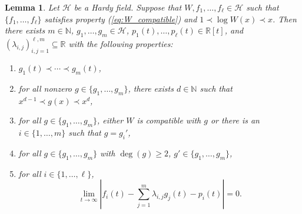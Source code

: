 \documentclass[12pt]{article}
\theoremstyle{plain} %
\newtheorem{lemma}[theorem]{Lemma}
\theoremstyle{definition} %
\theoremstyle{plain}
\theoremstyle{plain}
\numberwithin{equation}{section}
\newcommand{\N}{\mathbb{N}}
\newcommand{\R}{\mathbb{R}}
\renewcommand{\geq}{\geqslant}
\renewcommand{\subset}{\subseteq}
\newcommand{\1}{\mathbbm{1}}
\newcommand{\oo}{\infty}
\begin{document}
  \begin{lemma}\label{lem:richter_A.6}
Let $\mathcal{H}$ be a Hardy field. Suppose that $W,f_1,\dots, f_{\ell}\in \mathcal{H}$ such that $\{f_1,\dots, f_{\ell}\}$ satisfies property (\ref{eq:W_compatible}) and $1 \prec \log W(x)\prec x$. Then there exists $m \in \N$, $g_1,\dots, g_m \in \mathcal{H}$, $p_1(t),\dots , p_{\ell}(t) \in \R[t]$, and $(\lambda_{i,j})_{i,j=1}^{\ell,m}\subset \R$
with the following properties:
\begin{enumerate}[label = (\arabic*)]
    \item $g_1(t)\prec \cdots \prec g_m(t)$,
    \item for all nonzero $g\in \{g_1,\dots, g_m\}$, there exists $d\in \N$ such that $x^{d-1}\prec g(x)\prec x^d$,
    \item for all $g\in \{g_1,\dots, g_m\}$, either $W$ is compatible with $g$ or there is an $i\in \{1,\dots, m\}$ such that $g=g_i'$,
    \item for all $g\in \{g_1,\dots, g_m\}$ with $\deg(g)\geq 2$, $g'\in \{g_1,\dots, g_m\}$,
    \item for all $i\in \{1,\dots, \ell\}$,
    $$
    \lim_{t\to\oo}\left|f_i(t)-\sum_{j=1}^m\lambda_{i,j}g_j(t)-p_i(t)\right|=0.
    $$
\end{enumerate}

 \end{lemma}
\end{document}
